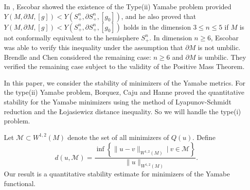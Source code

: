 \documentclass[12pt]{amsart}
\newcommand{\M}{{\mathcal{M}}}
\begin{document}
    In \cite{Es92a}, Escobar showed the existence of the Type(ii) Yamabe problem provided $Y(M,\partial M, [g]) < Y(S^n_+,\partial S^n_+,[g_0])$, and he also proved that $Y(M,\partial M, [g]) < Y(S^n_+,\partial S^n_+,[g_0])$ holds in the dimension $3\leq n \leq 5$ if $M$ is not conformally equivalent to the hemisphere $S^n_+$. In dimension $n\geq 6$, Escobar was able to verify this inequality under the assumption that $\partial M$ is not umbilic. Brendle and Chen\cite{BC14}
    considered the remaining case: $n\geq 6$ and $\partial M$ is umbilic. They verified the remaining case subject to the validity of the Positive Mass Theorem.
    
    In this paper, we consider the stability of minimizers of the Yamabe metrics. For the type(ii) Yamabe problem, Borquez, Caju and Hanne\cite{Ha26} proved the quantitative stability for the Yamabe minimizers using the method of Lyapunov-Schmidt reduction and the \L ojasiewicz distance inequality. So we will handle the type(i) problem.
    
    Let $\M \subset W^{1,2}(M)$ denote the set of all minimizers of $Q(u)$. Define 
    \begin{equation}
        d(u,\M) = \frac{\inf\left\{ \| u-v\|_{W^{1,2}(M)} \ | \ v \in \M\right\}}{\| u\|_{W^{1,2}(M)}}.
    \end{equation}
    Our result is a quantitative stability estimate for minimizers of the Yamabe functional.
    
\end{document}
